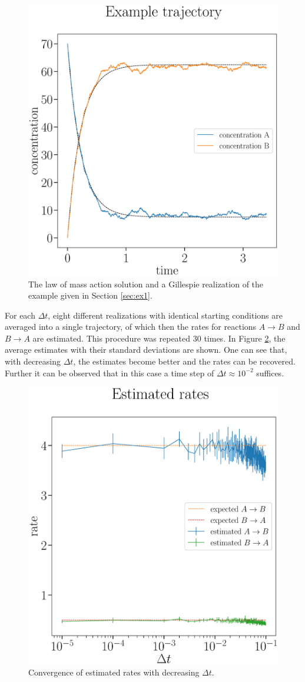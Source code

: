 \documentclass[oneside, abstracton, titlepage]{scrartcl}
\begin{document}
	\begin{figure}
		\begin{center}
			\includegraphics[width=.5\textwidth]{./figures_tex/aux_ex1_concentration_curves}
		\end{center}
		\caption{The law of mass action solution and a Gillespie realization of the example given in Section \ref{sec:ex1}.}
		\label{ex1:concentration-curves}
	\end{figure}
	
	For each $\Delta t$, eight different realizations with identical starting conditions are averaged into a single trajectory, of which then the rates for reactions $A\to B$ and $B\to A$ are estimated. This procedure was repeated $30$ times. In Figure \ref{ex1:rates-convergence}, the average estimates with their standard deviations are shown. One can see that, with decreasing $\Delta t$, the estimates become better and the rates can be recovered. Further it can be observed that in this case a time step of $\Delta t\approx 10^{-2}$ suffices.
	
	\begin{figure}
		\begin{center}
			\includegraphics[width=.5\textwidth]{./figures_tex/aux_rates_convergence}
		\end{center}
		\caption{Convergence of estimated rates with decreasing $\Delta t$.}
		\label{ex1:rates-convergence}
	\end{figure}
	
\end{document}
